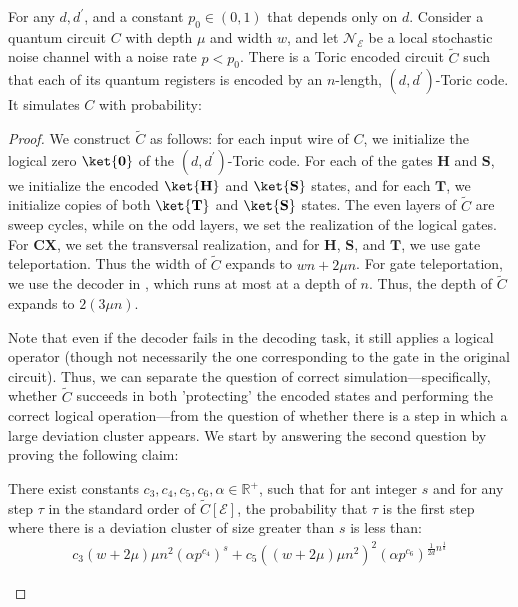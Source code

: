  
\begin{claim}
  For any $d, d^{\prime}$, and a constant $p_{0} \in (0,1)$ that depends only on $d$. Consider a quantum circuit $C$ with depth $\mu$ and width $w$, and let $\mathcal{N}_{\mathcal{E}}$ be a local stochastic noise channel with a noise rate $p < p_{0}$. There is a Toric encoded circuit $\tilde{C}$ such that each of its quantum registers is encoded by an $n$-length, $(d, d^{\prime})$-Toric code. It simulates $C$ with probability: 

\end{claim}

  \begin{proof}
    We construct $\tilde{C}$ as follows: for each input wire of $C$, we initialize the logical zero $\ket{\mathbf{0}}$ of the $(d,d^{\prime})$-Toric code. For each of the gates $\mathbf{H}$ and $\mathbf{S}$, we initialize the encoded $\ket{\mathbf{H}}$ and $\ket{\mathbf{S}}$ states, and for each $\mathbf{T}$, we initialize copies of both $\ket{\mathbf{T}}$ and $\ket{\mathbf{S}}$ states. The even layers of $\tilde{C}$ are sweep cycles, while on the odd layers, we set the realization of the logical gates. For $\mathbf{CX}$, we set the transversal realization, and for $\mathbf{H}$, $\mathbf{S}$, and $\mathbf{T}$, we use gate teleportation. Thus the width of $\tilde{C}$ expands to $ wn + 2\mu n$. For gate teleportation, we use the decoder in \Cref{ }, which runs at most at a depth of $n$. Thus, the depth of $\tilde{C}$ expands to $2(3\mu n)$.

Note that even if the decoder fails in the decoding task, it still applies a logical operator (though not necessarily the one corresponding to the gate in the original circuit). Thus, we can separate the question of correct simulation—specifically, whether $\tilde{C}$ succeeds in both 'protecting' the encoded states and performing the correct logical operation—from the question of whether there is a step in which a large deviation cluster appears. We start by answering the second question by proving the following claim:

\begin{claim}
  There exist constants $c_{3}, c_{4}, c_{5}, c_{6}, \alpha \in \mathbb{R}^{+}$, such that for ant integer $s$ and for any step $\tau$ in the standard order of $\tilde{C}[\mathcal{E}]$, the probability that $\tau$ is the first step where there is a deviation cluster of size greater than $s$ is less than:
\begin{equation*}
  \begin{split}
    c_{3} (w+2\mu)\mu n^{2} \left( \alpha p^{c_{4}} \right)^{s} +  c_{5} ((w+2\mu)\mu n^{2})^{2} \left( \alpha p^{c_{6}} \right)^{\frac{1}{2d}n^{\frac{1}{d}}} 
  \end{split}
\end{equation*}
\end{claim}


\end{proof}
